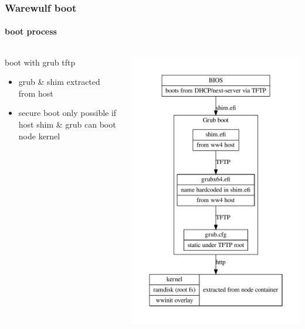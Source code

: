 \documentclass[aspectratio=169]{beamer}
\begin{document}
\begin{frame}[fragile]
\frametitle{Warewulf boot}
\framesubtitle{boot process}
\begin{columns}
\begin{block}{boot with grub tftp}
\begin{itemize}
  \item grub \& shim extracted from host
  \item secure boot only possible if host shim \& grub can boot node kernel
\end{itemize}
\end{block}
\includegraphics[width=.7\linewidth]{grub_ipxe}
\end{columns}
\end{frame}
\end{document}
